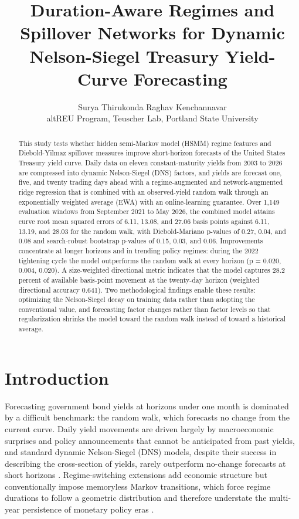\documentclass[10pt]{article}
\title{Duration-Aware Regimes and Spillover Networks for Dynamic Nelson-Siegel Treasury Yield-Curve Forecasting}
\author{Surya Thirukonda \quad Raghav Kenchannavar\\[3pt] \small altREU Program, Teuscher Lab, Portland State University}
\date{}
\begin{document}
\maketitle

\begin{abstract}
This study tests whether hidden semi-Markov model (HSMM) regime features and Diebold-Yilmaz spillover measures improve short-horizon forecasts of the United States Treasury yield curve. Daily data on eleven constant-maturity yields from 2003 to 2026 are compressed into dynamic Nelson-Siegel (DNS) factors, and yields are forecast one, five, and twenty trading days ahead with a regime-augmented and network-augmented ridge regression that is combined with an observed-yield random walk through an exponentially weighted average (EWA) with an online-learning guarantee. Over 1{,}149 evaluation windows from September 2021 to May 2026, the combined model attains curve root mean squared errors of 6.11, 13.08, and 27.06 basis points against 6.11, 13.19, and 28.03 for the random walk, with Diebold-Mariano p-values of 0.27, 0.04, and 0.08 and search-robust bootstrap p-values of 0.15, 0.03, and 0.06. Improvements concentrate at longer horizons and in trending policy regimes: during the 2022 tightening cycle the model outperforms the random walk at every horizon (p = 0.020, 0.004, 0.020). A size-weighted directional metric indicates that the model captures 28.2 percent of available basis-point movement at the twenty-day horizon (weighted directional accuracy 0.641). Two methodological findings enable these results: optimizing the Nelson-Siegel decay on training data rather than adopting the conventional value, and forecasting factor changes rather than factor levels so that regularization shrinks the model toward the random walk instead of toward a historical average.
\end{abstract}

\section{Introduction}

Forecasting government bond yields at horizons under one month is dominated by a difficult benchmark: the random walk, which forecasts no change from the current curve. Daily yield movements are driven largely by macroeconomic surprises and policy announcements that cannot be anticipated from past yields, and standard dynamic Nelson-Siegel (DNS) models, despite their success in describing the cross-section of yields, rarely outperform no-change forecasts at short horizons \cite{diebold2006, duffee2013}. Regime-switching extensions add economic structure but conventionally impose memoryless Markov transitions, which force regime durations to follow a geometric distribution and therefore understate the multi-year persistence of monetary policy eras \cite{hamilton1989, koopman2010}.
\end{document}
